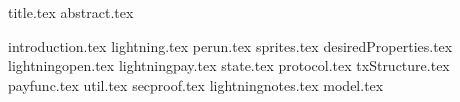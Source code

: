 \documentclass[11pt]{llncs}
\begin{document}
{title.tex}
\thispagestyle{plain}
{abstract.tex}

{introduction.tex}
{lightning.tex}
{perun.tex}
{sprites.tex}
{desiredProperties.tex}
{lightningopen.tex}
{lightningpay.tex}
{state.tex}
{protocol.tex}
{txStructure.tex}
{payfunc.tex}
{util.tex}
{secproof.tex}
{lightningnotes.tex}
{model.tex}

\end{document}
